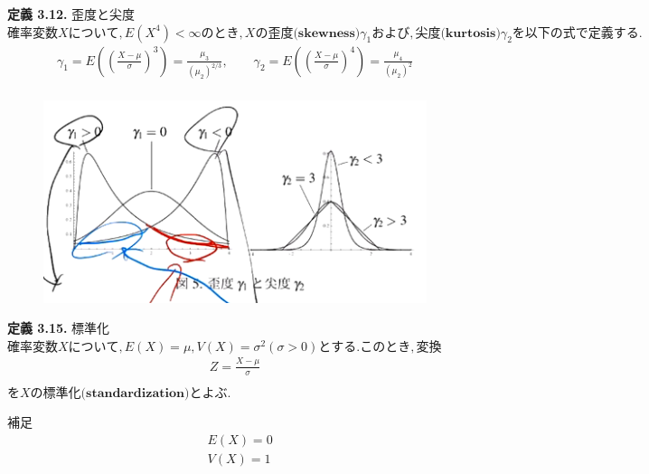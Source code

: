 \documentclass[dvipdfmx,10pt, a4j]{jarticle}
\theoremstyle{definition}
\begin{document}
\noindent
\textbf{定義 3.12.} 歪度と尖度\\
$確率変数Xについて, E(X^4) < \infty のとき, Xの \textbf{歪度(skewness)} \gamma_1 および, \textbf{尖度(kurtosis)} \gamma_2 を以下の式で定義する.$\\
\begin{align*}
    \gamma_1 = E\left(\left(\frac{X-\mu}{\sigma}\right)^3 \right) = \frac{\mu_3}{(\mu_2)^{2/3}}, \qquad \gamma_2 = E\left(\left(\frac{X-\mu}{\sigma}\right)^4 \right) = \frac{\mu_4}{(\mu_2)^{2}} \\
\end{align*}
\begin{figure}[htbp]
    \begin{center}
        \includegraphics[width=14.0cm]{D_8/img_3.png}
    \end{center}
\end{figure}

\noindent
\textbf{定義 3.15.} 標準化\\
$確率変数Xについて, E(X) = \mu, V(X) = \sigma^2 (\sigma > 0) とする. このとき, 変換$\\
\begin{align*}
    Z = \frac{X - \mu}{\sigma} \\
\end{align*}
$をXの \textbf{標準化(standardization)} とよぶ.$\\
\begin{itembox}[l]{補足}
    \begin{align*}
         & E(X) = 0 \\
         & V(X) = 1 \\
    \end{align*}
\end{itembox}\\
\end{document}
